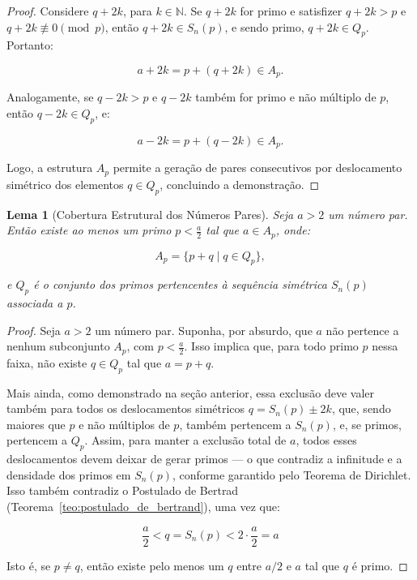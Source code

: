\documentclass[a4paper,11pt]{article}
\newtheorem{lemma}[theorem]{Lema}
\theoremstyle{definition}
\theoremstyle{remark}
\begin{document}
\begin{otherlanguage}{brazil}
\begin{proof}
		Considere \(q + 2k\), para \(k \in \mathbb{N}\). Se \(q + 2k\) for primo e satisfizer \(q + 2k > p\) e \(q + 2k \not\equiv 0 \pmod{p}\), então \(q + 2k \in S_n(p)\), e sendo primo, \(q + 2k \in Q_p\). Portanto:
		
		\[
		a + 2k = p + (q + 2k) \in A_p.
		\]
		
		Analogamente, se \(q - 2k > p\) e \(q - 2k\) também for primo e não múltiplo de \(p\), então \(q - 2k \in Q_p\), e:
		
		\[
		a - 2k = p + (q - 2k) \in A_p.
		\]
		
		Logo, a estrutura \(A_p\) permite a geração de pares consecutivos por deslocamento simétrico dos elementos \(q \in Q_p\), concluindo a demonstração.
	\end{proof}
	
	\begin{lemma}[Cobertura Estrutural dos Números Pares]\label{lema:cobertura_dos_pares}
		Seja \(a > 2\) um número par. Então existe ao menos um primo \(p < \frac{a}{2}\) tal que \(a \in A_p\), onde:
		
		\[
		A_p = \{p + q \mid q \in Q_p\},
		\]
		
		e \(Q_p\) é o conjunto dos primos pertencentes à sequência simétrica \(S_n(p)\) associada a \(p\).
	\end{lemma}
	
	\begin{proof}
		Seja \(a > 2\) um número par. Suponha, por absurdo, que \(a\) não pertence a nenhum subconjunto \(A_p\), com \(p < \frac{a}{2}\). Isso implica que, para todo primo \(p\) nessa faixa, não existe \(q \in Q_p\) tal que \(a = p + q\).
		
		Mais ainda, como demonstrado na seção anterior, essa exclusão deve valer também para todos os deslocamentos simétricos \(q = S_n(p) \pm 2k\), que, sendo maiores que \(p\) e não múltiplos de \(p\), também pertencem a \(S_n(p)\), e, se primos, pertencem a \(Q_p\). Assim, para manter a exclusão total de \(a\), todos esses deslocamentos devem deixar de gerar primos — o que contradiz a infinitude e a densidade dos primos em \(S_n(p)\), conforme garantido pelo Teorema de Dirichlet. Isso também contradiz o Postulado de Bertrad (Teorema~\ref{teo:postulado_de_bertrand}), uma vez que:
		
		\[
		\frac{a}{2} < q = S_n(p) < 2 \cdot \frac{a}{2} = a
		\]
		
		Isto é, se \(p \ne q\), então existe pelo menos um \(q\) entre  \(a/2\) e \(a\) tal que \(q\) é primo.
		

\end{proof}
\end{otherlanguage}
\end{document}
